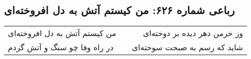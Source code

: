 \begin{center}
\section*{رباعی شماره ۶۲۶: من کیستم آتش به دل افروخته‌ای}
\label{sec:sh626}
\begin{longtable}{l p{0.5cm} r}
من کیستم آتش به دل افروخته‌ای
&&
وز خرمن دهر دیده بر دوخته‌ای
\\
در راه وفا چو سنگ و آتش گردم
&&
شاید که رسم به صبحت سوخته‌ای
\\
\end{longtable}
\end{center}
